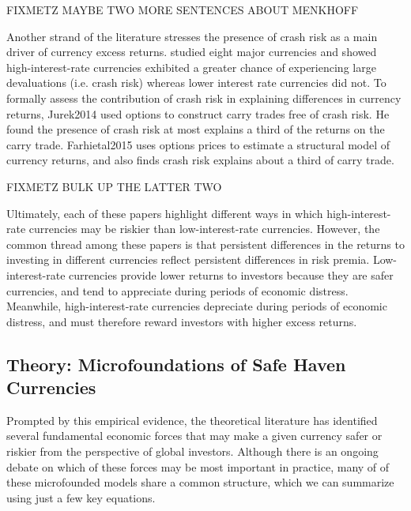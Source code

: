 \documentclass{ar-1col}
\begin{document}
FIXMETZ MAYBE TWO MORE SENTENCES ABOUT MENKHOFF

Another strand of the literature stresses the presence of crash risk as a main driver of currency excess returns. \citet{Brunnermeieretal2009} studied eight major currencies and showed high-interest-rate currencies exhibited a greater chance of experiencing large devaluations (i.e. crash risk) whereas lower interest rate currencies did not. To formally assess the contribution of crash risk in explaining differences in currency returns, Jurek2014 used options to construct carry trades free of crash risk. He found the presence of crash risk at most explains a third of the returns on the carry trade. Farhietal2015 uses options prices to estimate a structural model of currency returns, and also finds crash risk explains about a third of carry trade.

FIXMETZ BULK UP THE LATTER TWO


Ultimately, each of these papers highlight different ways in which high-interest-rate currencies may be riskier than low-interest-rate currencies. However, the common thread among these papers is that persistent differences in the returns to investing in different currencies reflect persistent differences in risk premia. Low-interest-rate currencies provide lower returns to investors because they are safer currencies, and tend to appreciate during periods of economic distress. Meanwhile, high-interest-rate currencies depreciate during periods of economic distress, and must therefore reward investors with higher excess returns.



\subsection{Theory: Microfoundations of Safe Haven Currencies}

Prompted by this empirical evidence, the theoretical literature has identified several fundamental economic forces that may make a given currency safer or riskier from the perspective of global investors. Although there is an ongoing debate on which of these forces may be most important in practice, many of of these microfounded models share a common structure, which we can summarize using just a few key equations.
\end{document}
